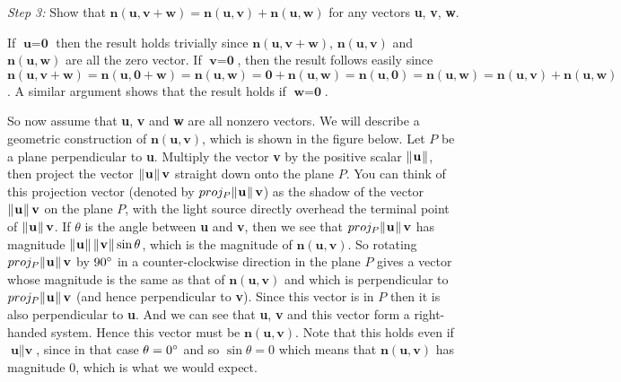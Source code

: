 \par\noindent \emph{Step 3:} Show that $\textbf{n}(\textbf{u},\textbf{v} + \textbf{w}) =
\textbf{n}(\textbf{u},\textbf{v}) + \textbf{n}(\textbf{u},\textbf{w})$ for any vectors \textbf{u}, \textbf{v},
\textbf{w}.\vspace{1mm}
\par\noindent If $\textbf{u} = \textbf{0}$ then the result holds trivially since $\textbf{n}(\textbf{u},\textbf{v} +
\textbf{w})$, $\textbf{n}(\textbf{u},\textbf{v})$ and $\textbf{n}(\textbf{u},\textbf{w})$ are all the zero vector. If
$\textbf{v} = \textbf{0}$, then the result follows easily since $\textbf{n}(\textbf{u},\textbf{v} + \textbf{w}) =
\textbf{n}(\textbf{u},\textbf{0} + \textbf{w}) = \textbf{n}(\textbf{u},\textbf{w}) = \textbf{0} +
\textbf{n}(\textbf{u},\textbf{w}) = \textbf{n}(\textbf{u},\textbf{0}) = \textbf{n}(\textbf{u},\textbf{w}) =
\textbf{n}(\textbf{u},\textbf{v}) + \textbf{n}(\textbf{u},\textbf{w})$. A similar argument shows that the result holds
if $\textbf{w} = \textbf{0}$.

So now assume that \textbf{u}, \textbf{v} and \textbf{w} are all nonzero vectors.
We will describe a geometric construction of $\textbf{n}(\textbf{u},\textbf{v})$, which is shown in the
figure below. Let $P$ be a plane perpendicular to \textbf{u}. Multiply the vector \textbf{v} by the positive
scalar $\lVert\mspace{1mu}\textbf{u}\mspace{1mu}\rVert$, then project the vector $\lVert\mspace{1mu}\textbf{u}\mspace{1mu}\rVert\,\textbf{v}$ straight down onto the plane $P$.
You can think of this projection vector (denoted by $proj_{P} \lVert\mspace{1mu}\textbf{u}\mspace{1mu}\rVert\,\textbf{v}$) as the shadow of the
vector $\lVert\mspace{1mu}\textbf{u}\mspace{1mu}\rVert\,\textbf{v}$ on the plane $P$, with the light source directly overhead the terminal point of
$\lVert\mspace{1mu}\textbf{u}\mspace{1mu}\rVert\,\textbf{v}$. If $\theta$ is the angle between \textbf{u} and \textbf{v}, then we see that
$proj_{P} \lVert\mspace{1mu}\textbf{u}\mspace{1mu}\rVert\,\textbf{v}$ has magnitude
$\lVert\mspace{1mu}\textbf{u}\mspace{1mu}\rVert\,\lVert\mspace{1mu}\textbf{v}\mspace{1mu}\rVert \sin \theta$, which is the magnitude of $\textbf{n}(\textbf{u},\textbf{v})$. So
rotating $proj_{P} \lVert\mspace{1mu}\textbf{u}\mspace{1mu}\rVert\,\textbf{v}$ by $90^\circ$ in a counter-clockwise direction in the plane $P$
gives a vector whose magnitude is the same as that of $\textbf{n}(\textbf{u},\textbf{v})$ and which is perpendicular to
$proj_{P} \lVert\mspace{1mu}\textbf{u}\mspace{1mu}\rVert\,\textbf{v}$ (and hence perpendicular to \textbf{v}). Since this vector is in $P$ then it is
also perpendicular to \textbf{u}. And we can see that \textbf{u}, \textbf{v} and this vector form a right-handed system.
Hence this vector must be $\textbf{n}(\textbf{u},\textbf{v})$. Note that this holds even if $\textbf{u} \parallel
\textbf{v}$, since in that case $\theta = 0^\circ$ and so $\sin \theta = 0$ which means that
$\textbf{n}(\textbf{u},\textbf{v})$ has magnitude $0$, which is what we would expect.

